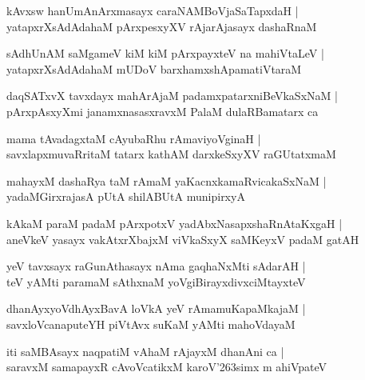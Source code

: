 \documentclass[twoside,12pt,openright]{book}
\def\S{\char'263}
\newcounter{shloka}[chapter]
\begin{document}
\begin{shloka}%
kAvxsw hanUmAnArxmasayx caraNAMBoVjaSaTapxdaH |\\
yatapxrXsAdAdahaM pArxpesxyXV rAjarAjasayx dashaRnaM 
\end{shloka}

\begin{shloka}%
sAdhUnAM saMgameV kiM kiM pArxpayxteV na mahiVtaLeV |\\
yatapxrXsAdAdahaM mUDoV barxhamxshApamatiVtaraM 
\end{shloka}

\begin{shloka}%
daqSATxvX tavxdayx mahArAjaM padamxpatarxniBeVkaSxNaM |\\
pArxpAsxyXmi janamxnasasxravxM PalaM dulaRBamatarx ca 
\end{shloka}

\begin{shloka}%
mama tAvadagxtaM cAyubaRhu rAmaviyoVginaH |\\
savxlapxmuvaRritaM tatarx kathAM darxkeSxyXV raGUtatxmaM 
\end{shloka}

\begin{shloka}%
mahayxM dashaRya taM rAmaM yaKacnxkamaRvicakaSxNaM |\\
yadaMGirxrajasA pUtA shilABUtA munipirxyA 
\end{shloka}

\begin{shloka}%
kAkaM paraM padaM pArxpotxV yadAbxNasapxshaRnAtaKxgaH |\\
aneVkeV yasayx vakAtxrXbajxM viVkaSxyX saMKeyxV padaM gatAH 
\end{shloka}

\begin{shloka}%
yeV tavxsayx raGunAthasayx nAma gaqhaNxMti sAdarAH |\\
teV yAMti paramaM sAthxnaM yoVgiBirayxdivxciMtayxteV 
\end{shloka}

\begin{shloka}%
dhanAyxyoVdhAyxBavA loVkA yeV rAmamuKapaMkajaM |\\
savxloVcanaputeYH piVtAvx suKaM yAMti mahoVdayaM 
\end{shloka}

\begin{shloka}%
iti saMBAsayx naqpatiM vAhaM rAjayxM dhanAni ca |\\
saravxM samapayxR cAvoVcatikxM karoV\S simx m ahiVpateV 
\end{shloka}
\end{document}
